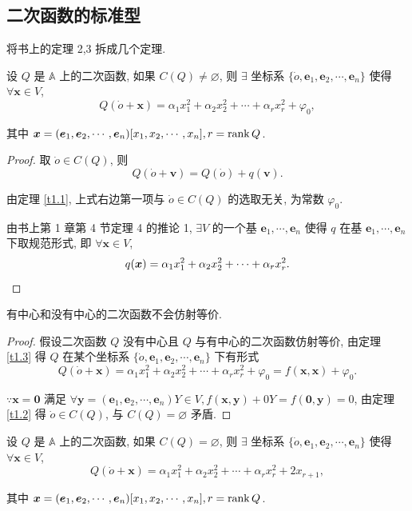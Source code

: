 \documentclass[color=black,device=normal,lang=cn,mode=geye]{elegantnote}
\begin{document}
\subsection{二次函数的标准型}
将书上的定理 2,3 拆成几个定理.
\begin{theorem}\label{t1.3}
    设 $Q$ 是 $\mathbb{A}$ 上的二次函数, 如果 $C(Q)\neq\varnothing$, 则 $\exists$ 坐标系 $\{\dot{o},\boldsymbol{e}_1,\boldsymbol{e}_2,\cdots,\boldsymbol{e}_n\}$ 使得 $\forall\boldsymbol{x}\in V$,
    \[Q(\dot{o}+\boldsymbol{x})=\alpha_1x^2_1+\alpha_2x^2_2+\cdots+\alpha_rx^2_r+\varphi_0,\]

    其中 $\boldsymbol{x}=(\boldsymbol{e}_1,\boldsymbol{e}_2,\cdots,\boldsymbol{e}_n)[x_1,x_2,\cdots,x_n],r=\operatorname{rank} Q$.
\end{theorem}
\begin{proof}
    取 $\dot{o}\in C(Q)$, 则
    \[Q(\dot{o}+\boldsymbol{v})=Q(\dot{o})+q(\boldsymbol{v}).\]

    由定理 \ref{t1.1}, 上式右边第一项与 $\dot{o}\in C(Q)$ 的选取无关, 为常数 $\varphi_0$.

    由书上第 1 章第 4 节定理 4 的推论 1, $\exists V$ 的一个基 $\boldsymbol{e}_1,\cdots,\boldsymbol{e}_n$ 使得 $q$ 在基 $\boldsymbol{e}_1,\cdots,\boldsymbol{e}_n$ 下取规范形式, 即 $\forall\boldsymbol{x}\in V$,
    \[q(\boldsymbol{x})=\alpha_1x^2_1+\alpha_2x^2_2+\cdots+\alpha_rx^2_r.\qedhere\]
\end{proof}
\begin{lemma}\label{l1.1}
    有中心和没有中心的二次函数不会仿射等价.
\end{lemma}
\begin{proof}
    假设二次函数 $Q$ 没有中心且 $Q$ 与有中心的二次函数仿射等价, 由定理 \ref{t1.3} 得 $Q$ 在某个坐标系 $\{\dot{o},\boldsymbol{e}_1,\boldsymbol{e}_2,\cdots,\boldsymbol{e}_n\}$ 下有形式
    \[Q(\dot{o}+\boldsymbol{x})=\alpha_1x^2_1+\alpha_2x^2_2+\cdots+\alpha_rx^2_r+\varphi_0=f(\boldsymbol{x},\boldsymbol{x})+\varphi_0.\]

    $\because\boldsymbol{x}=\boldsymbol{0}$ 满足 $\forall\boldsymbol{y}=(\boldsymbol{e}_1,\boldsymbol{e}_2,\cdots,\boldsymbol{e}_n)Y\in V,f(\boldsymbol{x},\boldsymbol{y})+0Y=f(\boldsymbol{0},\boldsymbol{y})=0$, 由定理 \ref{t1.2} 得 $\dot{o}\in C(Q)$, 与 $C(Q)=\varnothing$ 矛盾.
\end{proof}
\begin{theorem}
    设 $Q$ 是 $\mathbb{A}$ 上的二次函数, 如果 $C(Q)=\varnothing$, 则 $\exists$ 坐标系 $\{\dot{o},\boldsymbol{e}_1,\boldsymbol{e}_2,\cdots,\boldsymbol{e}_n\}$ 使得 $\forall\boldsymbol{x}\in V$,
    \[Q(\dot{o}+\boldsymbol{x})=\alpha_1x^2_1+\alpha_2x^2_2+\cdots+\alpha_rx^2_r+2x_{r+1},\]

    其中 $\boldsymbol{x}=(\boldsymbol{e}_1,\boldsymbol{e}_2,\cdots,\boldsymbol{e}_n)[x_1,x_2,\cdots,x_n],r=\operatorname{rank} Q$.
\end{theorem}
\end{document}
